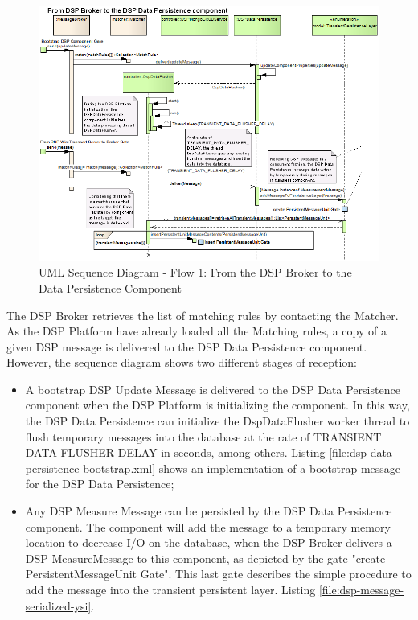 \begin{figure}[!b]
  \centering
  \includegraphics[scale=0.5]{../diagrams/From-DSP-Broker-To-DSPDataPersistence-General-Sequence}
  \caption{UML Sequence Diagram - Flow 1: From the DSP Broker to the Data
  Persistence Component}
  \label{fig:From-DSP-Broker-To-DSPDataPersistence-General-Sequence}
\end{figure}

The DSP Broker retrieves the list of matching rules by contacting the Matcher.
As the DSP Platform have already loaded all the Matching rules, a copy of a
given DSP message is delivered to the DSP Data Persistence component. However,
the sequence diagram shows two different stages of reception:

\begin{itemize}
  \item A bootstrap DSP Update Message is delivered to the DSP Data Persistence
  component when the DSP Platform is initializing the component. In this way,
  the DSP Data Persistence can initialize the DspDataFlusher worker thread to
  flush temporary messages into the database at the rate of
  TRANSIENT\underline{ }DATA\underline{ }FLUSHER\underline{ }DELAY in seconds,
  among others. Listing \ref{file:dsp-data-persistence-bootstrap.xml} shows an
  implementation of a bootstrap message for the DSP Data Persistence;
  \item Any DSP Measure Message can be persisted by the DSP Data Persistence
  component. The component will add the message to a temporary memory location
  to decrease I/O on the database, when the DSP Broker delivers a DSP
  MeasureMessage to this component, as depicted by the gate "create
  PersistentMessageUnit Gate". This last gate describes the simple procedure
  to add the message into the transient persistent layer. Listing
  \ref{file:dsp-message-serialized-ysi}.
\end{itemize}

